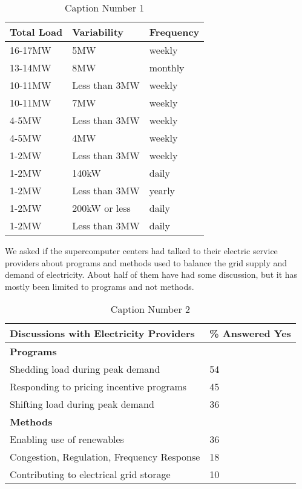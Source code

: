 \begin{table}[htbp]

\begin{center}
\caption{Caption Number 1}
\begin{tabular}{|p{65pt}|l|l|}
\hline
\textbf{Total Load}&
\textbf{Variability}&
\textbf{Frequency} \\
\hline
16-17MW&
5MW&
weekly \\
\hline
13-14MW&
8MW&
monthly \\
\hline
10-11MW&
Less than 3MW&
weekly \\
\hline
10-11MW&
7MW&
weekly \\
\hline
4-5MW&
Less than 3MW&
weekly \\
\hline
4-5MW&
4MW&
weekly \\
\hline
1-2MW&
Less than 3MW&
weekly \\
\hline
1-2MW&
140kW&
daily \\
\hline
1-2MW&
Less than 3MW&
yearly \\
\hline
1-2MW&
200kW or less&
daily \\
\hline
1-2MW&
Less than 3MW&
daily \\
\hline
\end{tabular}
\label{tab1}
\end{center}
\end{table}

We asked if the supercomputer centers had talked to their electric service
providers about programs and methods used to balance the grid supply and
demand of electricity. About half of them have had some discussion, but it
has mostly been limited to programs and not methods.


\begin{table}[htbp]

\begin{center}
\caption{Caption Number 2}
\begin{tabular}{|p{230pt}|l|}
\hline
\textbf{Discussions with Electricity Providers}&
{\%} Answered Yes \\
\hline
\textbf{Programs}&
~ \\
\hline
Shedding load during peak demand&
54 \\
\hline
Responding to pricing incentive programs&
45 \\
\hline
Shifting load during peak demand&
36 \\
\hline
\textbf{Methods}&
~ \\
\hline
Enabling use of renewables&
36 \\
\hline
Congestion, Regulation, Frequency Response&
18 \\
\hline
Contributing to electrical grid storage&
10 \\
\hline
\end{tabular}
\label{tab2}
\end{center}
\end{table}

